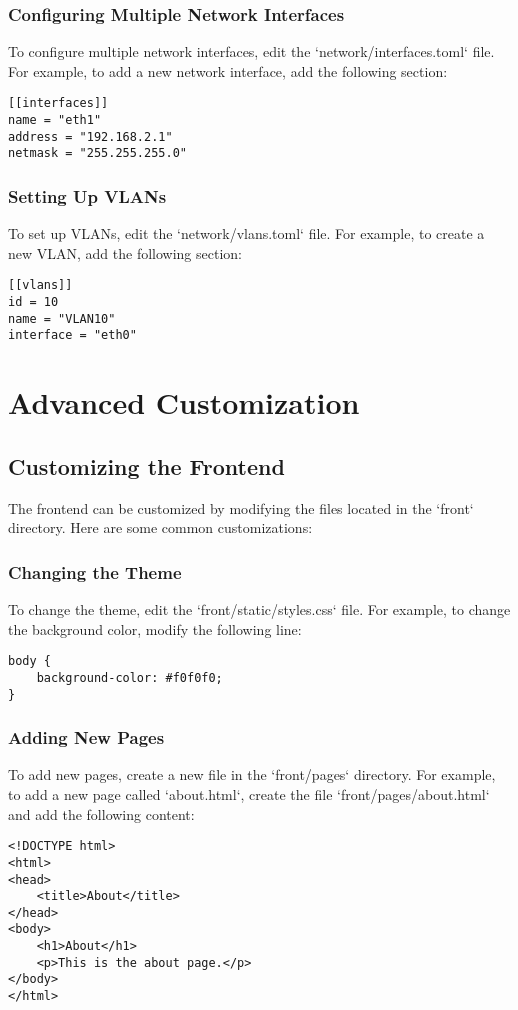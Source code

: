 \documentclass{article}
\begin{document}
\subsubsection{Configuring Multiple Network Interfaces}
To configure multiple network interfaces, edit the `network/interfaces.toml` file. For example, to add a new network interface, add the following section:
\begin{verbatim}
[[interfaces]]
name = "eth1"
address = "192.168.2.1"
netmask = "255.255.255.0"
\end{verbatim}

\subsubsection{Setting Up VLANs}
To set up VLANs, edit the `network/vlans.toml` file. For example, to create a new VLAN, add the following section:
\begin{verbatim}
[[vlans]]
id = 10
name = "VLAN10"
interface = "eth0"
\end{verbatim}

\section{Advanced Customization}
\subsection{Customizing the Frontend}
The frontend can be customized by modifying the files located in the `front` directory. Here are some common customizations:

\subsubsection{Changing the Theme}
To change the theme, edit the `front/static/styles.css` file. For example, to change the background color, modify the following line:
\begin{verbatim}
body {
    background-color: #f0f0f0;
}
\end{verbatim}

\subsubsection{Adding New Pages}
To add new pages, create a new file in the `front/pages` directory. For example, to add a new page called `about.html`, create the file `front/pages/about.html` and add the following content:
\begin{verbatim}
<!DOCTYPE html>
<html>
<head>
    <title>About</title>
</head>
<body>
    <h1>About</h1>
    <p>This is the about page.</p>
</body>
</html>
\end{verbatim}
\end{document}

